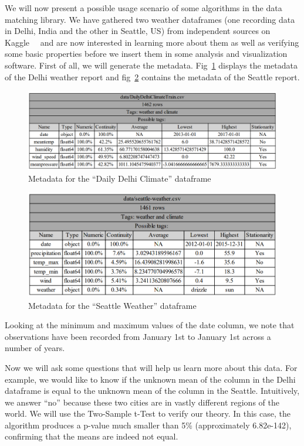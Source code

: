 We will now present a possible usage scenario of some algorithms in the data matching library.
We have gathered two weather dataframes (one recording data in Delhi, India and the other in Seattle, US) from independent
sources on Kaggle~~\cite{kaggleDailyDelhiClimate,kaggleSeattleWeather} and are now interested in learning more about them
as well as verifying some basic properties before we insert them in some analysis and visualization software.
First of all, we will generate the metadata.
Fig~\ref{fig:daily_delhi_climate} displays the metadata of the Delhi weather report and fig~\ref{fig:seattle_weather} contains
the metadata of the Seattle report.

\begin{figure}[h]
    \centering
    \includegraphics[width=12cm]{figures/matching_weather_data/daily_delhi_climate}
    \caption{Metadata for the ``Daily Delhi Climate'' dataframe}
    \label{fig:daily_delhi_climate}
\end{figure}

\begin{figure}[h]
    \centering
    \includegraphics[width=12cm]{figures/matching_weather_data/seattle_weather}
    \caption{Metadata for the ``Seattle Weather'' dataframe}
    \label{fig:seattle_weather}
\end{figure}

Looking at the minimum and maximum values of the date column, we note that observations have been recorded from January 1st
to January 1st across a number of years.

Now we will ask some questions that will help us learn more about this data.
For example, we would like to know if the unknown mean of the column  in the Delhi dataframe is equal to the
unknown mean of the column  in the Seattle.
Intuitively, we answer ``no'' because these two cities are in vastly different regions of the world.
We will use the Two-Sample t-Test to verify our theory.
In this case, the algorithm produces a p-value much smaller than 5\% (approximately 6.82e-142), confirming that the means
are indeed not equal.

